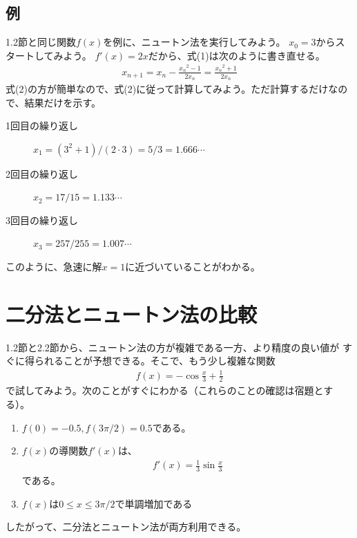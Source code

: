 \documentclass[a4paper, platex, dvipdfmx]{jsarticle}
\begin{document}
\subsection{例}
1.2節と同じ関数$f(x)$を例に、ニュートン法を実行してみよう。
$x_0=3$からスタートしてみよう。
$f'(x)=2x$だから、式(1)は次のように書き直せる。
\begin{align}
  x_{n+1}=x_n-\frac{{x_n}^2-1}{2x_n}=\frac{{x_n}^2+1}{2x_n}
\end{align}
式(2)の方が簡単なので、式(2)に従って計算してみよう。ただ計算するだけなので、結果だけを示す。
\begin{description}
  \item[1回目の繰り返し] $x_1=(3^2+1)/(2\cdot 3)=5/3=1.666\cdots$
  \item[2回目の繰り返し] $x_2=17/15=1.133\cdots$
  \item[3回目の繰り返し] $x_3=257/255=1.007\cdots$
\end{description}
このように、急速に解$x=1$に近づいていることがわかる。

\section{二分法とニュートン法の比較}
1.2節と2.2節から、ニュートン法の方が複雑である一方、より精度の良い値が
すぐに得られることが予想できる。そこで、もう少し複雑な関数
\begin{align}
  f(x)=-\cos\frac{x}{3}+\frac{1}{2}
\end{align}
で試してみよう。次のことがすぐにわかる（これらのことの確認は宿題とする）。
\begin{enumerate}
  \item $f(0)=-0.5,f(3\pi/2)=0.5$である。
  \item $f(x)$の導関数$f'(x)$は、
  \begin{align}
    f'(x)=\frac{1}{3}\sin\frac{x}{3}
  \end{align}
  である。
  \item $f(x)$は$0\leq x\leq 3\pi/2$で単調増加である
\end{enumerate}
したがって、二分法とニュートン法が両方利用できる。
\end{document}
